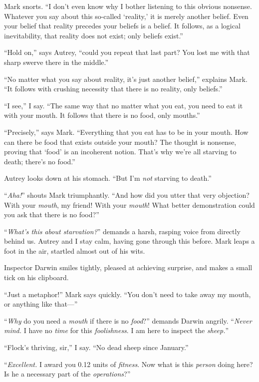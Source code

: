 {
 Mark snorts. ``I don't even know
why I bother listening to this obvious nonsense. Whatever you say about
this so-called `reality,' it is merely
another belief. Even your belief that reality precedes your beliefs is
a belief. It follows, as a logical inevitability, that reality does not
exist; only beliefs exist.''}

{
 ``Hold on,'' says Autrey,
``could you repeat that last part? You lost me with
that sharp swerve there in the middle.''}

{
 ``No matter what you say about reality,
it's just another belief,'' explains
Mark. ``It follows with crushing necessity that there
is no reality, only beliefs.''}

{
 ``I see,'' I say.
``The same way that no matter what you eat, you need
to eat it with your mouth. It follows that there is no food, only
mouths.''}

{
 ``Precisely,'' says Mark.
``Everything that you eat has to be in your mouth. How
can there be food that exists outside your mouth? The thought is
nonsense, proving that `food' is an
incoherent notion. That's why we're all
starving to death; there's no
food.''}

{
 Autrey looks down at his stomach. ``But
I'm \textit{not} starving to
death.''}

{
 ``\textit{Aha!}'' shouts Mark
triumphantly. ``And how did you utter that very
objection? With your \textit{mouth}, my friend! With your
\textit{mouth}! What better demonstration could you ask that there is
no food?''}

{
 ``\textit{What's this about
starvation?}'' demands a harsh, rasping voice from
directly behind us. Autrey and I stay calm, having gone through this
before. Mark leaps a foot in the air, startled almost out of his wits.}

{
 Inspector Darwin smiles tightly, pleased at achieving surprise,
and makes a small tick on his clipboard.}

{
 ``Just a metaphor!'' Mark says
quickly. ``You don't need to take away
my mouth, or anything like that---''}

{
 ``\textit{Why} do you need a \textit{mouth} if
there is no \textit{food}?'' demands Darwin angrily.
``\textit{Never mind.} I have no \textit{time} for
this \textit{foolishness}. I am here to inspect the
\textit{sheep.}''}

{
 ``Flock's thriving,
sir,'' I say. ``No dead sheep since
January.''}

{
 ``\textit{Excellent.} I award you 0.12 units of
\textit{fitness}. Now what is this \textit{person} doing here? Is he a
necessary part of the \textit{operations}?''}

